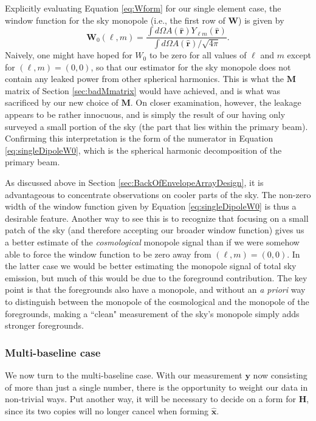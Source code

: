 \documentclass[twolcolumn,apj,iop,numberedappendix]{emulateapj}
\newcommand{\xhat}{\hat{\mathbf{x}}}
\newcommand{\Hmat}{\mathbf{H}}
\newcommand{\M}{\mathbf{M}}
\newcommand{\W}{\mathbf{W}}
\begin{document}
Explicitly evaluating Equation \eqref{eq:Wform} for our single element case, the window function for the sky monopole (i.e., the first row of $\W$) is given by
\begin{equation}
\W_{0}(\ell,m) = \frac{\int d\Omega A(\mathbf{\hat{r}}) Y_{\ell m} (\mathbf{\hat{r}})}{\int d\Omega A(\mathbf{\hat{r}}) / \sqrt{4 \pi}}.
\label{eq:singleDipoleW0}
\end{equation}
Naively, one might have hoped for $W_0$ to be zero for all values of $\ell$ and $m$ except for $(\ell, m) = (0,0)$, so that our estimator for the sky monopole does not contain any leaked power from other spherical harmonics. This is what the $\M$ matrix of Section \ref{sec:badMmatrix} would have achieved, and is what was sacrificed by our new choice of $\M$. On closer examination, however, the leakage appears to be rather innocuous, and is simply the result of our having only surveyed a small portion of the sky (the part that lies within the primary beam). Confirming this interpretation is the form of the numerator in Equation \eqref{eq:singleDipoleW0}, which is the spherical harmonic decomposition of the primary beam.

As discussed above in Section \ref{sec:BackOfEnvelopeArrayDesign}, it is advantageous to concentrate observations on cooler parts of the sky. The non-zero width of the window function given by Equation \eqref{eq:singleDipoleW0} is thus a desirable feature. Another way to see this is to recognize that focusing on a small patch of the sky (and therefore accepting our broader window function) gives us a better estimate of the \emph{cosmological} monopole signal than if we were somehow able to force the window function to be zero away from $(\ell,m) = (0,0)$. In the latter case we would be better estimating the monopole signal of total sky emission, but much of this would be due to the foreground contribution. The key point is that the foregrounds also have a monopole, and without an \emph{a priori} way to distinguish between the monopole of the cosmological and the monopole of the foregrounds, making a ``clean" measurement of the sky's monopole simply adds stronger foregrounds.

\subsubsection{Multi-baseline case}

We now turn to the multi-baseline case. With our measurement $\mathbf{y}$ now consisting of more than just a single number, there is the opportunity to weight our data in non-trivial ways. Put another way, it will be necessary to decide on a form for $\Hmat$, since its two copies will no longer cancel when forming $\xhat$.
\end{document}
